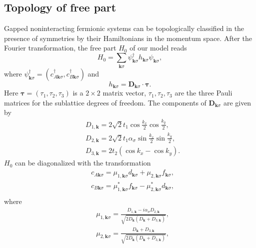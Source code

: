 \documentclass[amsmath,superscriptaddress,showpacs,aps,prb,twocolumn]{revtex4-1}
\begin{document}
\subsection{Topology of free part}\label{topo_free_part}
\par Gapped noninteracting fermionic systems can be topologically classified in the presence of symmetries by their Hamiltonians in the momentum space\cite{SRFL_PRB2008}. After the Fourier transformation, the free part $H_0$ of our model reads
\begin{equation}
H_0=\sum_{\mathbf{k}\sigma}\psi^{\dagger}_{\mathbf{k}\sigma}h_{\mathbf{k}\sigma}\psi_{\mathbf{k}\sigma},
\end{equation}
where $\psi^{\dagger}_{\mathbf{k}\sigma}=(c^{\dagger}_{A\mathbf{k}\sigma},c^{\dagger}_{B\mathbf{k}\sigma})$ and
\begin{equation}
h_{\mathbf{k}\sigma}={\mathbf{D}_{\mathbf{k}\sigma}}\cdot\bm{\tau}.
\end{equation}
Here $\bm{\tau}=(\tau_{1},\tau_{2},\tau_{3})$ is a $2\times2$ matrix vector, $\tau_{1},\tau_{2},\tau_{3}$ are the three Pauli matrices for the sublattice degrees of freedom. The components of $\mathbf{D}_{\mathbf{k}\sigma}$ are given by
\begin{equation}
\begin{aligned}
&D_{1,\mathbf{k}}=2\sqrt{2}t_{1}\cos\frac{k_{x}}{2}\cos\frac{k_{y}}{2},\\
&D_{2,\mathbf{k}}=2\sqrt{2}t_{1}\alpha_\sigma\sin\frac{k_{x}}{2}\sin\frac{k_{y}}{2},\\
&D_{3,\mathbf{k}}=2t_{2}(\cos k_{x}-\cos k_{y}).
\end{aligned}
\end{equation}
$H_0$ can be diagonalized with the transformation
\begin{equation}
\begin{aligned}
&c_{A\mathbf{k}\sigma}=\mu_{1,\mathbf{k}\sigma}d_{\mathbf{k}\sigma}+\mu_{2,\mathbf{k}\sigma}f_{\mathbf{k}\sigma},\\
&c_{B\mathbf{k}\sigma}=\mu^{\ast}_{1,\mathbf{k}\sigma}f_{\mathbf{k}\sigma}-\mu^{\ast}_{2,\mathbf{k}\sigma}d_{\mathbf{k}\sigma},\\
\end{aligned}
\end{equation}
where
\begin{equation}
\begin{aligned}
&\mu_{1,\mathbf{k}\sigma}=\frac{D_{1,\mathbf{k}}-i\alpha_\sigma D_{2,\mathbf{k}}}{\sqrt{2D_{\mathbf{k}}(D_{\mathbf{k}}+D_{3,\mathbf{k}})}},\\
&\mu_{2,\mathbf{k}\sigma}=\frac{D_{\mathbf{k}}+D_{3,\mathbf{k}}}{\sqrt{2D_{\mathbf{k}}(D_{\mathbf{k}}+D_{3,\mathbf{k}})}},\\
\end{aligned}
\end{equation}
\end{document}
